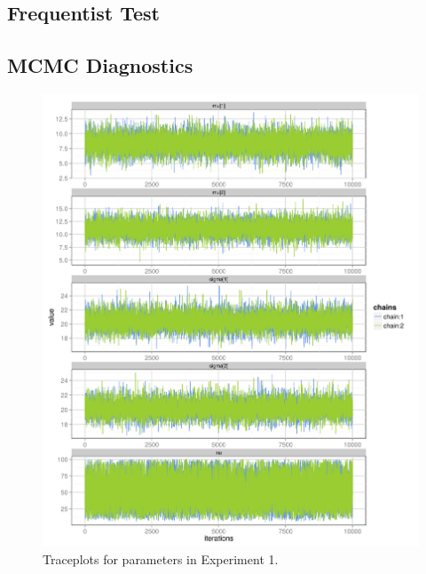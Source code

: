 

\clearpage

\subsection{Frequentist Test}





\clearpage

\subsection{MCMC Diagnostics}

\begin{figure}[ht!]
  \centering
  \includegraphics{figures/main/trace_1.png}
  \caption{Traceplots for parameters in Experiment 1.}
  \label{fig:trace_1}
\end{figure}

